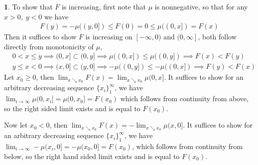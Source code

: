\documentclass[10.5pt]{article}
\theoremstyle{definition}
\newtheorem{pb}{}
\newcommand{\set}[1]{\{#1\}}
\newcommand{\tand}{\text{ and }}
\begin{document}
    \begin{pb}
        To show that \(F\) is increasing, first note that \(\mu\) is nonnegative, so that for any \(x>0, \; y<0\) we have
        \begin{align*}
            F(y) = -\mu((y,0]) \leq F(0) = 0 \leq \mu((0,x]) = F(x)
        \end{align*}
        Then it suffices to show \(F\) is increasing on \([-\infty,0) \tand (0,\infty]\), both follow directly from monotonicity of \(\mu\),
        \begin{align*}
            &0 < x \leq y \implies (0,x] \subset (0,y] \implies \mu((0,x]) \leq \mu((0,y]) \implies F(x) < F(y) \\
            &y \leq x < 0 \implies (x,0] \subset (y,0] \implies -\mu((0,y]) \leq -\mu((0,x]) \implies F(y) < F(x)
        \end{align*}
        Let \(x_0 \geq 0\), then \(\lim_{x\searrow x_0}F(x) = \lim_{x\searrow x_0}\mu(0,x]\). It suffices to show for an arbitrary decreasing sequence \(\set{x_i}_1^\infty\), we have
        \(\lim_{i \to \infty}\mu(0,x_i] = \mu(0,x_0] = F(x_0)\) which follows from continuity from above, so the right sided limit exists and is equal to \(F(x_0)\).

        Now let \(x_0 < 0\), then \(\lim_{x\searrow x_0}F(x) = -\lim_{x\searrow x_0}\mu(x,0]\). It suffices to show for an arbitrary decreasing sequence \(\set{x_i}_1^\infty\), we have
        \(\lim_{i \to \infty}-\mu(x_i,0] = -\mu(x_0,0] = F(x_0)\), which follows from continuity from below, so the right hand sided limit exists and is equal to \(F(x_0)\).
    \end{pb}
\end{document}
